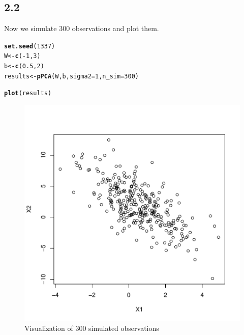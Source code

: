 \documentclass[10pt, a4paper, english]{article}\usepackage[]{graphicx}\usepackage[dvipsnames]{xcolor}
\makeatletter
\def\maxwidth{ %
  \ifdim\Gin@nat@width>\linewidth
    \linewidth
  \else
    \Gin@nat@width
  \fi
}
\newcommand{\hlnum}[1]{\textcolor[rgb]{0.686,0.059,0.569}{#1}}%
\newcommand{\hlopt}[1]{\textcolor[rgb]{0,0,0}{#1}}%
\newcommand{\hlstd}[1]{\textcolor[rgb]{0.345,0.345,0.345}{#1}}%
\newcommand{\hlkwb}[1]{\textcolor[rgb]{0.69,0.353,0.396}{#1}}%
\newcommand{\hlkwc}[1]{\textcolor[rgb]{0.333,0.667,0.333}{#1}}%
\newcommand{\hlkwd}[1]{\textcolor[rgb]{0.737,0.353,0.396}{\textbf{#1}}}%
\newenvironment{kframe}{%
 \def\at@end@of@kframe{}%
 \ifinner\ifhmode%
  \def\at@end@of@kframe{\end{minipage}}%
  \begin{minipage}{\columnwidth}%
 \fi\fi%
 \def\FrameCommand##1{\hskip\@totalleftmargin \hskip-\fboxsep
 \colorbox{shadecolor}{##1}\hskip-\fboxsep
     \hskip-\linewidth \hskip-\@totalleftmargin \hskip\columnwidth}%
 \MakeFramed {\advance\hsize-\width
   \@totalleftmargin\z@ \linewidth\hsize
   \@setminipage}}%
 {\par\unskip\endMakeFramed%
 \at@end@of@kframe}
\newenvironment{knitrout}{}{} %
\makeatother
\begin{document}
\subsection{2.2}
Now we simulate 300 observations and plot them.
\begin{knitrout}
\color{fgcolor}\begin{kframe}
\begin{alltt}
\hlkwd{set.seed}\hlstd{(}\hlnum{1337}\hlstd{)}
\hlstd{W} \hlkwb{<-} \hlkwd{c}\hlstd{(}\hlopt{-}\hlnum{1}\hlstd{,}\hlnum{3}\hlstd{)}
\hlstd{b} \hlkwb{<-} \hlkwd{c}\hlstd{(}\hlnum{0.5}\hlstd{,} \hlnum{2}\hlstd{)}
\hlstd{results} \hlkwb{<-} \hlkwd{pPCA}\hlstd{(W,b,}\hlkwc{sigma2}\hlstd{=}\hlnum{1}\hlstd{,}\hlkwc{n_sim}\hlstd{=}\hlnum{300}\hlstd{)}
\end{alltt}
\end{kframe}
\end{knitrout}


\begin{knitrout}
\color{fgcolor}\begin{kframe}
\begin{alltt}
\hlkwd{plot}\hlstd{(results)}
\end{alltt}
\end{kframe}\begin{figure}
\includegraphics[width=\maxwidth]{figure/unnamed-chunk-17-1} \caption[Visualization of 300 simulated observations]{Visualization of 300 simulated observations}\label{fig:unnamed-chunk-17}
\end{figure}

\end{knitrout}
\end{document}
